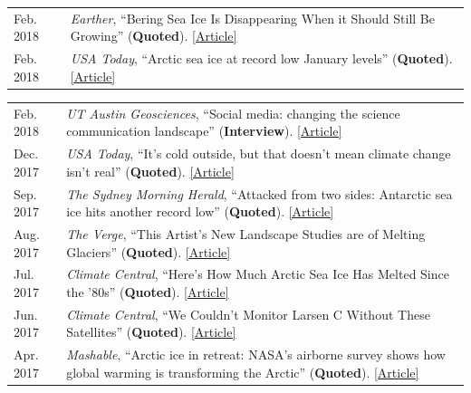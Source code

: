\documentclass[margin,line,palatino,courier,10pt]{res}
\begin{document}
\begin{resume}
\begin{tabular}{@{}p{0.9in}p{4in}}
Feb. 2018 & \textit{Earther}, ``Bering Sea Ice Is Disappearing When it Should Still Be Growing'' (\textbf{Quoted}). \href{https://earther.com/bering-sea-ice-is-disappearing-at-a-time-when-it-should-1823193914}{[Article]}\\
Feb. 2018 & \textit{USA Today}, ``Arctic sea ice at record low January levels'' (\textbf{Quoted}). \href{https://www.usatoday.com/story/weather/2018/02/20/arctic-sea-ice-record-low-january-levels/355738002/}{[Article]}\\
\end{tabular}
\begin{tabular}{@{}p{0.9in}p{4in}}
Feb. 2018 & \textit{UT Austin Geosciences}, ``Social media: changing the science communication landscape'' (\textbf{Interview}). \href{https://www.jsg.utexas.edu/science-yall/social-media-landscape/}{[Article]}\\
Dec. 2017 & \textit{USA Today}, ``It's cold outside, but that doesn't mean climate change isn't real'' (\textbf{Quoted}). \href{https://www.usatoday.com/story/weather/2017/12/28/its-cold-outside-but-doesnt-mean-climate-change-isnt-real/987948001/}{[Article]}\\
Sep. 2017 & \textit{The Sydney Morning Herald}, ``Attacked from two sides: Antarctic sea ice hits another record low'' (\textbf{Quoted}). \href{http://www.smh.com.au/environment/climate-change/attacked-from-two-sides-antarctic-sea-ice-hits-another-record-low-20170926-gyouuc.html}{[Article]}\\
Aug. 2017 & \textit{The Verge}, ``This Artist's New Landscape Studies are of Melting Glaciers'' (\textbf{Quoted}). \href{http://sites.uci.edu/zlabe/media-and-outreach/?preview_id=567&preview_nonce=d7dd77fe7a&_thumbnail_id=-1&preview=true}{[Article]}\\
Jul. 2017 & \textit{Climate Central}, ``Here's How Much Arctic Sea Ice Has Melted Since the '80s'' (\textbf{Quoted}). \href{http://www.climatecentral.org/news/arctic-sea-ice-melt-since-the-80s-21637}{[Article]}\\
Jun. 2017 & \textit{Climate Central}, ``We Couldn't Monitor Larsen C Without These Satellites'' (\textbf{Quoted}). \href{http://www.climatecentral.org/news/larsen-c-monitoring-satellites-21564}{[Article]}\\
Apr. 2017 & \textit{Mashable}, ``Arctic ice in retreat: NASA's airborne survey shows how global warming is transforming the Arctic'' (\textbf{Quoted}). \href{http://mashable.com/2017/04/13/arctic-meltdown-nasa-photos-changing-ice/?utm_cid=hp-n-1#BgdepWyM6Pq3}{[Article]}\\

\end{tabular}
\end{resume}
\end{document}
